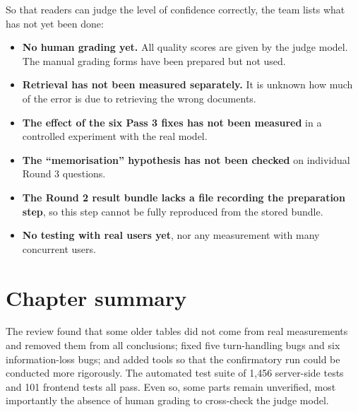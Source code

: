 So that readers can judge the level of confidence correctly, the team lists what has not yet been done:

\begin{itemize}
    \item \textbf{No human grading yet.} All quality scores are given by the judge model. The manual grading forms have been prepared but not used.
    \item \textbf{Retrieval has not been measured separately.} It is unknown how much of the error is due to retrieving the wrong documents.
    \item \textbf{The effect of the six Pass 3 fixes has not been measured} in a controlled experiment with the real model.
    \item \textbf{The ``memorisation'' hypothesis has not been checked} on individual Round 3 questions.
    \item \textbf{The Round 2 result bundle lacks a file recording the preparation step}, so this step cannot be fully reproduced from the stored bundle.
    \item \textbf{No testing with real users yet}, nor any measurement with many concurrent users.
\end{itemize}

\section{Chapter summary}

The review found that some older tables did not come from real measurements and removed them from all conclusions; fixed five turn-handling bugs and six information-loss bugs; and added tools so that the confirmatory run could be conducted more rigorously. The automated test suite of 1,456 server-side tests and 101 frontend tests all pass. Even so, some parts remain unverified, most importantly the absence of human grading to cross-check the judge model.
